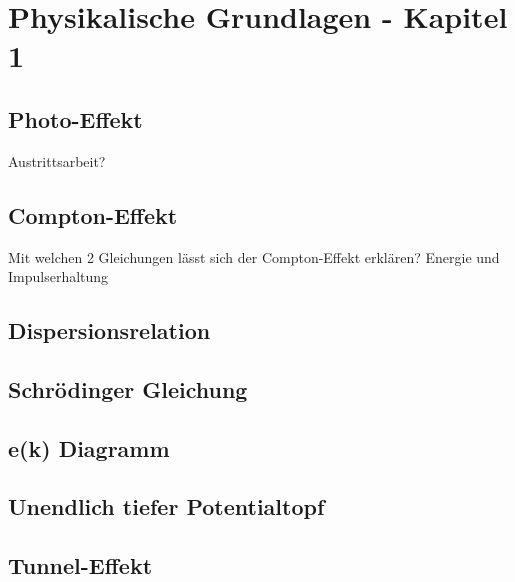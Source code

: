\documentclass{article}
\begin{document}
\section{Physikalische Grundlagen - Kapitel 1}
\subsection{Photo-Effekt }\label{k1:photoEf}
Austrittsarbeit?
\subsection{Compton-Effekt }\label{k1:comptonEf}
Mit welchen 2 Gleichungen l\"asst sich der Compton-Effekt erkl\"aren? Energie und Impulserhaltung
\subsection{Dispersionsrelation }\label{k1:dispersionsrelation}



\subsection{Schrödinger Gleichung }\label{k1:schrGl}


\subsection{e(k) Diagramm }\label{k1:ekdiag}

\subsection{Unendlich tiefer Potentialtopf }\label{k1:pottopf}

\subsection{Tunnel-Effekt }\label{k1:tunnEf}

\end{document}
